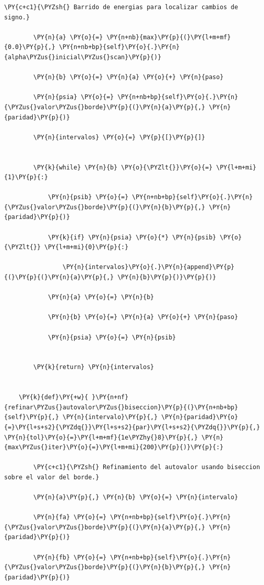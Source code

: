 \documentclass[11pt]{article}
\makeatletter
\def\PY@reset{\let\PY@it=\relax \let\PY@bf=\relax \let\PY@ul=\relax \let\PY@tc=\relax \let\PY@bc=\relax \let\PY@ff=\relax}
\def\PY@tok#1{\csname PY@tok@#1\endcsname}
\def\PY@toks#1+{\ifx\relax#1\empty\else \PY@tok{#1}\expandafter\PY@toks\fi}
\def\PY@do#1{\PY@bc{\PY@tc{\PY@ul{\PY@it{\PY@bf{\PY@ff{#1}}}}}}}
\def\PY#1#2{\PY@reset\PY@toks#1+\relax+\PY@do{#2}}
\makeatother
\begin{document}
\begin{tcolorbox}[breakable, size=fbox, boxrule=1pt, pad at break*=1mm,colback=cellbackground, colframe=cellborder]
\begin{Verbatim}[commandchars=\\\{\}]
        \PY{c+c1}{\PYZsh{} Barrido de energias para localizar cambios de signo.}

        \PY{n}{a} \PY{o}{=} \PY{n+nb}{max}\PY{p}{(}\PY{l+m+mf}{0.0}\PY{p}{,} \PY{n+nb+bp}{self}\PY{o}{.}\PY{n}{alpha\PYZus{}inicial\PYZus{}scan}\PY{p}{)}

        \PY{n}{b} \PY{o}{=} \PY{n}{a} \PY{o}{+} \PY{n}{paso}

        \PY{n}{psia} \PY{o}{=} \PY{n+nb+bp}{self}\PY{o}{.}\PY{n}{\PYZus{}valor\PYZus{}borde}\PY{p}{(}\PY{n}{a}\PY{p}{,} \PY{n}{paridad}\PY{p}{)}

        \PY{n}{intervalos} \PY{o}{=} \PY{p}{[}\PY{p}{]}


        \PY{k}{while} \PY{n}{b} \PY{o}{\PYZlt{}}\PY{o}{=} \PY{l+m+mi}{1}\PY{p}{:}

            \PY{n}{psib} \PY{o}{=} \PY{n+nb+bp}{self}\PY{o}{.}\PY{n}{\PYZus{}valor\PYZus{}borde}\PY{p}{(}\PY{n}{b}\PY{p}{,} \PY{n}{paridad}\PY{p}{)}

            \PY{k}{if} \PY{n}{psia} \PY{o}{*} \PY{n}{psib} \PY{o}{\PYZlt{}} \PY{l+m+mi}{0}\PY{p}{:}

                \PY{n}{intervalos}\PY{o}{.}\PY{n}{append}\PY{p}{(}\PY{p}{(}\PY{n}{a}\PY{p}{,} \PY{n}{b}\PY{p}{)}\PY{p}{)}

            \PY{n}{a} \PY{o}{=} \PY{n}{b}

            \PY{n}{b} \PY{o}{=} \PY{n}{a} \PY{o}{+} \PY{n}{paso}

            \PY{n}{psia} \PY{o}{=} \PY{n}{psib}


        \PY{k}{return} \PY{n}{intervalos}


    \PY{k}{def}\PY{+w}{ }\PY{n+nf}{refinar\PYZus{}autovalor\PYZus{}biseccion}\PY{p}{(}\PY{n+nb+bp}{self}\PY{p}{,} \PY{n}{intervalo}\PY{p}{,} \PY{n}{paridad}\PY{o}{=}\PY{l+s+s2}{\PYZdq{}}\PY{l+s+s2}{par}\PY{l+s+s2}{\PYZdq{}}\PY{p}{,} \PY{n}{tol}\PY{o}{=}\PY{l+m+mf}{1e\PYZhy{}8}\PY{p}{,} \PY{n}{max\PYZus{}iter}\PY{o}{=}\PY{l+m+mi}{200}\PY{p}{)}\PY{p}{:}

        \PY{c+c1}{\PYZsh{} Refinamiento del autovalor usando biseccion sobre el valor del borde.}

        \PY{n}{a}\PY{p}{,} \PY{n}{b} \PY{o}{=} \PY{n}{intervalo}

        \PY{n}{fa} \PY{o}{=} \PY{n+nb+bp}{self}\PY{o}{.}\PY{n}{\PYZus{}valor\PYZus{}borde}\PY{p}{(}\PY{n}{a}\PY{p}{,} \PY{n}{paridad}\PY{p}{)}

        \PY{n}{fb} \PY{o}{=} \PY{n+nb+bp}{self}\PY{o}{.}\PY{n}{\PYZus{}valor\PYZus{}borde}\PY{p}{(}\PY{n}{b}\PY{p}{,} \PY{n}{paridad}\PY{p}{)}



\end{Verbatim}
\end{tcolorbox}
\end{document}

